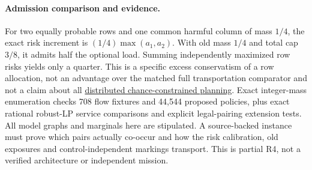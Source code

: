 \documentclass{article}
\begin{document}
\paragraph{Admission comparison and evidence.}
For two equally probable rows and one common harmful column
of mass \(1/4\), the exact risk increment is
\((1/4)\max(a_1,a_2)\). With old mass \(1/4\) and total
cap \(3/8\), it admits half the optional load. Summing
independently maximized row risks yields only a quarter.
This is a specific excess conservatism of a row allocation,
not an advantage over the matched full transportation comparator
and not a claim about all
\href{https://groups.csail.mit.edu/mers/papers/Ono-Williams_AAMAS10.pdf}{distributed chance-constrained planning}.
Exact integer-mass enumeration checks 708 flow fixtures and
44,544 proposed policies, plus exact rational robust-LP
service comparisons and explicit legal-pairing extension tests.
All model graphs and marginals here are stipulated. A source-backed
instance must prove which pairs actually co-occur and how the
risk calibration, old exposures and control-independent markings
transport. This is partial R4, not a verified architecture
or independent mission.
\end{document}
